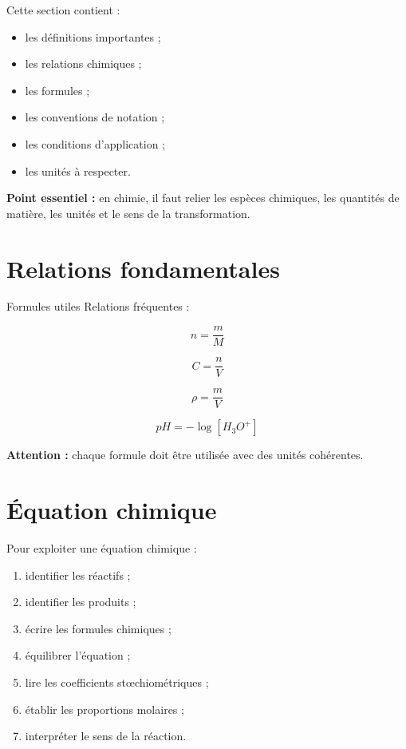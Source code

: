 \documentclass[11pt,a4paper]{article}
\begin{document}
\begin{cadretheorie}
Cette section contient :
\begin{itemize}
    \item les définitions importantes ;
    \item les relations chimiques ;
    \item les formules ;
    \item les conventions de notation ;
    \item les conditions d’application ;
    \item les unités à respecter.
\end{itemize}

\medskip

\textbf{Point essentiel :} en chimie, il faut relier les espèces chimiques, les quantités de matière, les unités et le sens de la transformation.
\end{cadretheorie}

\section{Relations fondamentales}

\begin{cadrevert}{Formules utiles}
Relations fréquentes :

\[
n=\frac{m}{M}
\]

\[
C=\frac{n}{V}
\]

\[
\rho=\frac{m}{V}
\]

\[
pH=-\log[H_3O^+]
\]

\medskip

\textbf{Attention :} chaque formule doit être utilisée avec des unités cohérentes.
\end{cadrevert}

\section{Équation chimique}

\begin{cadremethode}
Pour exploiter une équation chimique :

\begin{enumerate}
    \item identifier les réactifs ;
    \item identifier les produits ;
    \item écrire les formules chimiques ;
    \item équilibrer l’équation ;
    \item lire les coefficients stœchiométriques ;
    \item établir les proportions molaires ;
    \item interpréter le sens de la réaction.
\end{enumerate}
\end{cadremethode}
\end{document}
